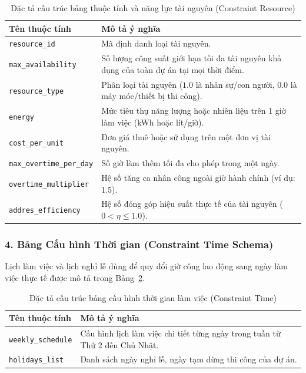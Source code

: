 \begin{table}[H]
\centering
\caption{Đặc tả cấu trúc bảng thuộc tính và năng lực tài nguyên (Constraint Resource)}
\label{tab:constraint_resource_schema}
\begin{tabular}{|p{4.5cm}|p{10.5cm}|}
\hline
\textbf{Tên thuộc tính} & \textbf{Mô tả ý nghĩa} \\ \hline
\texttt{resource\_id} & Mã định danh loại tài nguyên. \\ \hline
\texttt{max\_availability} & Số lượng công suất giới hạn tối đa tài nguyên khả dụng của toàn dự án tại mọi thời điểm. \\ \hline
\texttt{resource\_type} & Phân loại tài nguyên ($1.0$ là nhân sự/con người, $0.0$ là máy móc/thiết bị thi công). \\ \hline
\texttt{energy} & Mức tiêu thụ năng lượng hoặc nhiên liệu trên 1 giờ làm việc (kWh hoặc lít/giờ). \\ \hline
\texttt{cost\_per\_unit} & Đơn giá thuê hoặc sử dụng trên một đơn vị tài nguyên. \\ \hline
\texttt{max\_overtime\_per\_day} & Số giờ làm thêm tối đa cho phép trong một ngày. \\ \hline
\texttt{overtime\_multiplier} & Hệ số tăng ca nhân công ngoài giờ hành chính (ví dụ: 1.5). \\ \hline
\texttt{addres\_efficiency} & Hệ số đóng góp hiệu suất thực tế của tài nguyên ($0 < \eta \le 1.0$). \\ \hline
\end{tabular}
\end{table}

\subsubsection{4. Bảng Cấu hình Thời gian (Constraint Time Schema)}
Lịch làm việc và lịch nghỉ lễ dùng để quy đổi giờ công lao động sang ngày làm việc thực tế được mô tả trong Bảng~\ref{tab:constraint_time_schema}.

\begin{table}[H]
\centering
\caption{Đặc tả cấu trúc bảng cấu hình thời gian làm việc (Constraint Time)}
\label{tab:constraint_time_schema}
\begin{tabular}{|p{4.5cm}|p{10.5cm}|}
\hline
\textbf{Tên thuộc tính} & \textbf{Mô tả ý nghĩa} \\ \hline
\texttt{weekly\_schedule} & Cấu hình lịch làm việc chi tiết từng ngày trong tuần từ Thứ 2 đến Chủ Nhật. \\ \hline
\texttt{holidays\_list} & Danh sách ngày nghỉ lễ, ngày tạm dừng thi công của dự án. \\ \hline
\end{tabular}
\end{table}

